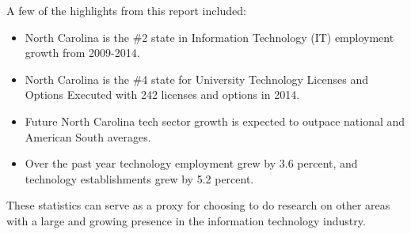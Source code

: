 A few of the highlights from this report included:

\begin{itemize}  
\item North Carolina is the \#2 state in Information Technology (IT) employment growth from 2009-2014.
\item North Carolina is the \#4 state for University Technology Licenses and Options Executed with 242 licenses and options in 2014.
\item Future North Carolina tech sector growth is expected to outpace national and American South averages.
\item Over the past year technology employment grew by 3.6 percent, and technology establishments grew by 5.2 percent.
\end{itemize}

These statistics can serve as a proxy for choosing to do research on other areas with a large and growing presence in the information technology industry.
